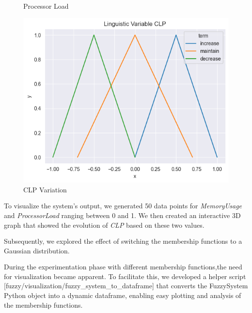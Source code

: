 \documentclass[11pt]{report}
\begin{document}
\begin{figure}[htbp]
\begin{minipage}{0.32\textwidth}
        \caption{Processor Load}
        \label{fig:memory_usage}
    \end{minipage}
    \hfill
    \begin{minipage}{0.32\textwidth}
        \centering
        \includegraphics[width=\textwidth]{../images/triangular_CLP}
        \caption{CLP Variation}
        \label{fig:clp}
    \end{minipage}
\end{figure}



To visualize the system's output, we generated 50 data points for \textit{MemoryUsage} and \textit{ProcessorLoad} ranging between 0 and 1.
We then created an interactive 3D graph that showed the evolution of \textit{CLP} based on these two values.




Subsequently, we explored the effect of switching the membership functions to a Gaussian distribution.

\begin{figure}[h]
\centering
\end{figure}

During the experimentation phase with different membership functions,the need for visualization became apparent.
To facilitate this, we developed a helper script [fuzzy/visualization/fuzzy\_system\_to\_dataframe] that converts the
FuzzySystem Python object into a dynamic dataframe, enabling easy plotting and analysis of the membership functions.
\end{document}
